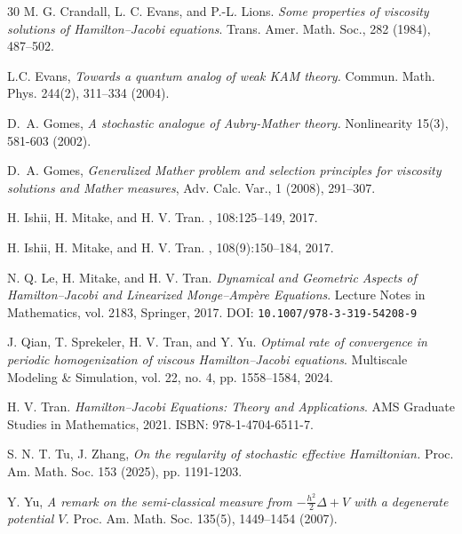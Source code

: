 \documentclass[12pt,reqno]{amsart}
\numberwithin{figure}{section}
\theoremstyle{plain}
\numberwithin{equation}{section}
\begin{document}
\begin{thebibliography}{30}
M. G. Crandall, L. C. Evans, and P.-L. Lions.  
\textit{Some properties of viscosity solutions of Hamilton--Jacobi equations}.  
Trans. Amer. Math. Soc., 282 (1984), 487--502.


L.C. Evans,  
\emph{Towards a quantum analog of weak KAM theory.} 
Commun. Math. Phys. 244(2), 311–334 (2004).

D.~A. Gomes,
\emph{A stochastic analogue of Aubry-Mather theory.} 
Nonlinearity 15(3), 581-603 (2002).

D.~A. Gomes,
{\em Generalized Mather problem and selection principles for viscosity solutions and Mather measures},
Adv. Calc. Var., 1 (2008), 291--307.


H. Ishii, H. Mitake, and H. V. Tran.
, 108:125--149, 2017.

H. Ishii, H. Mitake, and H. V. Tran.
, 108(9):150--184, 2017.

N. Q. Le, H. Mitake, and H. V. Tran.
\textit{Dynamical and Geometric Aspects of Hamilton–Jacobi and Linearized Monge–Ampère Equations}.
Lecture Notes in Mathematics, vol. 2183, Springer, 2017.
DOI: \texttt{10.1007/978-3-319-54208-9}

J. Qian, T. Sprekeler, H. V. Tran, and Y. Yu.  
\textit{Optimal rate of convergence in periodic homogenization of viscous Hamilton--Jacobi equations}.  
Multiscale Modeling \& Simulation, vol. 22, no. 4, pp. 1558--1584, 2024. 


H. V. Tran. 
\textit{Hamilton--Jacobi Equations: Theory and Applications}. 
AMS Graduate Studies in Mathematics, 2021. 
ISBN: 978-1-4704-6511-7.

S. N. T. Tu, J. Zhang,
\emph{On the regularity of stochastic effective Hamiltonian.}
Proc. Am. Math. Soc. 153 (2025), pp. 1191-1203.

Y. Yu,  
\emph{A remark on the semi-classical measure from $-\frac{h^2}{2}\Delta+V$ with a degenerate potential $V$.} 
Proc. Am. Math. Soc. 135(5), 1449–1454 (2007).

\end {thebibliography}
\end{document}
